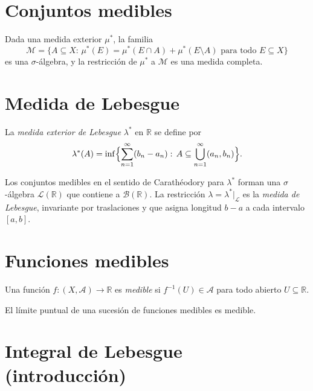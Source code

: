 \section{Conjuntos medibles}

\begin{theorem}[Carathéodory]
\label{teo:caratheodory}
Dada una medida exterior $\mu^*$, la familia
\[
  \mathcal{M}=\{A\subseteq X:\,\mu^*(E)=\mu^*(E\cap A)+\mu^*(E\setminus A)\text{ para todo }E\subseteq X\}
\]
es una $\sigma$-álgebra, y la restricción de $\mu^*$ a $\mathcal{M}$ es una medida completa.
\end{theorem}

\section{Medida de Lebesgue}

\begin{definition}
\label{def:lebesgue-exterior}
La \emph{medida exterior de Lebesgue} $\lambda^*$ en $\mathbb{R}$ se define por
\[
  \lambda^*(A)=\inf\Bigl\{\sum_{n=1}^{\infty}(b_n-a_n):\,A\subseteq\bigcup_{n=1}^{\infty}(a_n,b_n)\Bigr\}.
\]
\end{definition}

\begin{theorem}
\label{teo:lebesgue-medida}
Los conjuntos medibles en el sentido de Carathéodory para $\lambda^*$ forman una $\sigma$-álgebra $\mathcal{L}(\mathbb{R})$ que contiene a $\mathcal{B}(\mathbb{R})$. La restricción $\lambda=\lambda^*|_{\mathcal{L}}$ es la \emph{medida de Lebesgue}, invariante por traslaciones y que asigna longitud $b-a$ a cada intervalo $[a,b]$.
\end{theorem}

\section{Funciones medibles}

\begin{definition}
\label{def:medible}
Una función $f\colon(X,\mathcal{A})\to\mathbb{R}$ es \emph{medible} si $f^{-1}(U)\in\mathcal{A}$ para todo abierto $U\subseteq\mathbb{R}$.
\end{definition}

\begin{proposition}
\label{prop:limite-medible}
El límite puntual de una sucesión de funciones medibles es medible.
\end{proposition}

\section{Integral de Lebesgue (introducción)}

